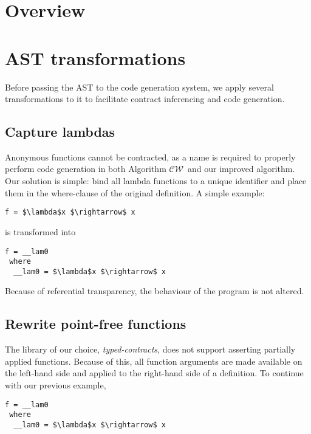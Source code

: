 \documentclass[10pt]{report}
\newcommand{\CW}{$\mathcal{CW}$}
\begin{document}
\section{Overview}
\label{section:overview}




\section{AST transformations}
Before passing the AST to the code generation system, we apply several transformations to it to facilitate contract inferencing and code generation.

\subsection{Capture lambdas}
Anonymous functions cannot be contracted, as a name is required to properly  perform code generation in both Algorithm \CW ~and our improved algorithm.
Our solution is simple: bind all lambda functions to a unique identifier and place them in the where-clause of the original definition.
A simple example:

\begin{lstlisting}[mathescape]
f = $\lambda$x $\rightarrow$ x
\end{lstlisting}

is transformed into

\begin{lstlisting}[mathescape,caption=Result of lambda capture transformation.]
f = __lam0                   
 where                    
  __lam0 = $\lambda$x $\rightarrow$ x
\end{lstlisting}

Because of referential transparency, the behaviour of the program is not altered.

\subsection{Rewrite point-free functions}
The library of our choice, \textit{typed-contracts}, does not support asserting partially applied functions.
Because of this, all function arguments are made available on the left-hand side and applied to the right-hand side of a definition.
To continue with our previous example,

\begin{lstlisting}[mathescape]
f = __lam0                   
 where                    
  __lam0 = $\lambda$x $\rightarrow$ x
\end{lstlisting}
\end{document}
